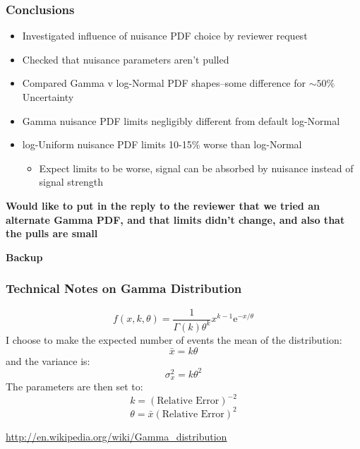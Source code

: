 \documentclass{beamer}
\begin{document}
\begin{frame}
\frametitle{Conclusions}
\begin{itemize}
  \item Investigated influence of nuisance PDF choice by reviewer request
  \item Checked that nuisance parameters aren't pulled
  \item Compared Gamma v log-Normal PDF shapes--some difference for $\sim 50\%$ Uncertainty
  \item Gamma nuisance PDF limits negligibly different from default log-Normal
  \item log-Uniform nuisance PDF limits 10-15\% worse than log-Normal
  \begin{itemize}
    \item Expect limits to be worse, signal can be absorbed by nuisance instead of signal strength
  \end{itemize}
\end{itemize}
\begin{center}
\textbf{Would like to put in the reply to the reviewer that we tried an alternate Gamma PDF, and that limits didn't change, and also that the pulls are small}
\end{center}
\end{frame}

\begin{frame}
\begin{center}
\huge
\textbf{Backup}
\end{center}
\end{frame}

\begin{frame}
\frametitle{Technical Notes on Gamma Distribution}
\begin{equation}
  f(x,k,\theta) = \frac{1}{\Gamma(k)\theta^k} x^{k-1} \mathrm{e}^{-x/\theta}
\end{equation}
I choose to make the expected number of events the mean of the distribution:
\begin{equation}
\bar{x} = k\theta
\end{equation}
and the variance is:
\begin{equation}
\sigma_{x}^2 = k\theta^2
\end{equation}
The parameters are then set to:
\begin{equation}
k = (\text{Relative Error})^{-2}
\end{equation}
\begin{equation}
\theta =  \bar{x} (\text{Relative Error})^2
\end{equation}


\begin{center}
\textcolor{blue}{\tiny\underline{\url{http://en.wikipedia.org/wiki/Gamma\_distribution}}}
\end{center}

\end{frame}
\end{document}
